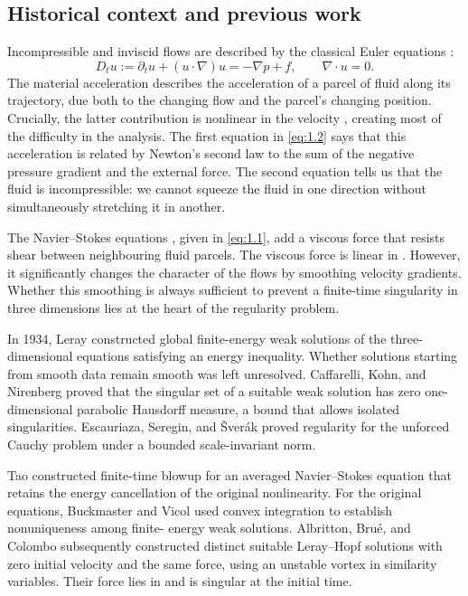 \subsection{Historical context and previous work}\label{sec:1.1}
Incompressible and inviscid flows are described
by the classical Euler equations \cite{ref-12}:
\begin{equation}
  D_tu:=\partial_tu+(u\cdot\nabla)u=-\nabla p+f,
  \qquad \nabla\cdot u=0.
  \tag{1.2}\label{eq:1.2}
\end{equation}
The material acceleration  describes the acceleration of a parcel of fluid along its trajectory,
due both to the changing flow and the parcel's changing position. Crucially, the latter
contribution  is nonlinear in the velocity , creating most of the difficulty in the
analysis. The first equation in \eqref{eq:1.2} says that this acceleration is related by Newton's second
law to the sum of the negative pressure gradient and the external force. The second equation
tells us that the fluid is incompressible: we cannot squeeze the fluid in one direction without
simultaneously stretching it in another.

The Navier--Stokes equations \cite{ref-18,ref-21}, given in \eqref{eq:1.1}, add a viscous force that resists shear
between neighbouring fluid parcels. The viscous force is linear in . However, it significantly
changes the character of the flows by smoothing velocity gradients. Whether this smoothing
is always sufficient to prevent a finite-time singularity in three dimensions lies at the heart
of the regularity problem.

In 1934, Leray \cite{ref-16} constructed global finite-energy weak solutions of the three-dimensional
equations satisfying an energy inequality. Whether solutions starting from smooth data
remain smooth was left unresolved. Caffarelli, Kohn, and Nirenberg \cite{ref-5} proved that the
singular set of a suitable weak solution has zero one-dimensional parabolic Hausdorff
measure, a bound that allows isolated singularities. Escauriaza, Seregin, and Šverák \cite{ref-11}
proved regularity for the unforced Cauchy problem under a bounded scale-invariant
 norm.

Tao \cite{ref-22} constructed finite-time blowup for an averaged Navier--Stokes equation that
retains the energy cancellation of the original nonlinearity. For the original equations,
Buckmaster and Vicol \cite{ref-4} used convex integration to establish nonuniqueness among finite-
energy weak solutions. Albritton, Brué, and Colombo \cite{ref-1} subsequently constructed distinct
suitable Leray--Hopf solutions with zero initial velocity and the same force, using an unstable
vortex in similarity variables. Their force lies in  and is singular at the initial time.

